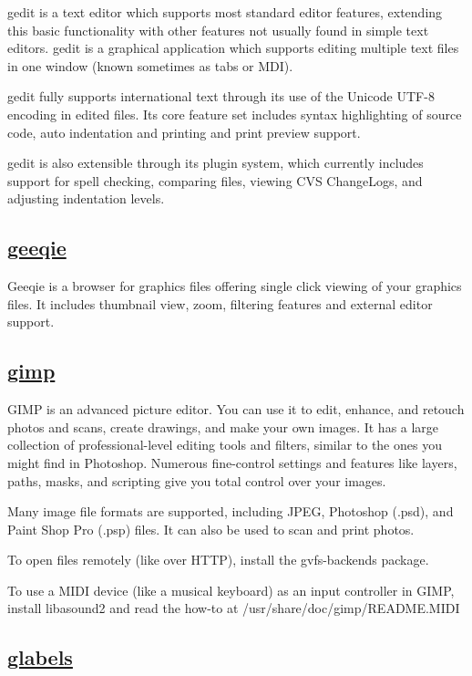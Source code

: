  gedit is a text editor which supports most standard editor features,
 extending this basic functionality with other features not usually
 found in simple text editors. gedit is a graphical application which
 supports editing multiple text files in one window (known sometimes as
 tabs or MDI).
 
 gedit fully supports international text through its use of the Unicode
 UTF-8 encoding in edited files. Its core feature set includes syntax
 highlighting of source code, auto indentation and printing and print preview
 support.
 
 gedit is also extensible through its plugin system, which currently
 includes support for spell checking, comparing files, viewing CVS
 ChangeLogs, and adjusting indentation levels.

\subsection{\href{http://geeqie.sourceforge.net/}{geeqie}}

 Geeqie is a browser for graphics files offering single click viewing of
 your graphics files. It includes thumbnail view, zoom, filtering
 features and external editor support.

\subsection{\href{http://www.gimp.org/}{gimp}}

 GIMP is an advanced picture editor. You can use it to edit, enhance, and
 retouch photos and scans, create drawings, and make your own images.
 It has a large collection of professional-level editing tools and
 filters, similar to the ones you might find in Photoshop. Numerous
 fine-control settings and features like layers, paths, masks, and
 scripting give you total control over your images.
 
 Many image file formats are supported, including JPEG, Photoshop (.psd),
 and Paint Shop Pro (.psp) files. It can also be used to scan and print
 photos.
 
 To open files remotely (like over HTTP), install the gvfs-backends
 package.
 
 To use a MIDI device (like a musical keyboard) as an input controller in GIMP,
 install libasound2 and read the how-to at /usr/share/doc/gimp/README.MIDI

\subsection{\href{http://glabels.sourceforge.net/}{glabels}}

